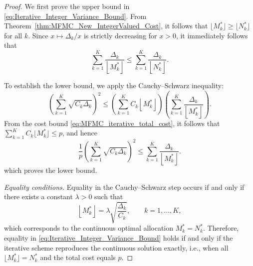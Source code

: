\begin{proof}
We first prove the upper bound in \eqref{eq:Iterative_Integer_Variance_Bound}.  
From Theorem~\ref{thm:MFMC_New_IntegerValued_Cost}, it follows that $\lfloor M_k^* \rfloor \ge \lfloor N_k^* \rfloor$ for all $k$.  
Since $x \mapsto \Delta_k/x$ is strictly decreasing for $x > 0$, it immediately follows that
\[
\sum_{k=1}^K \frac{\Delta_k}{\left\lfloor M_k^* \right\rfloor} 
\le \sum_{k=1}^K \frac{\Delta_k}{\left\lfloor N_k^* \right\rfloor}.
\]

\medskip
\noindent
To establish the lower bound, we apply the Cauchy--Schwarz inequality:
%
\[
\left(\sum_{k=1}^K \sqrt{C_k \Delta_k}\right)^2
\le
\left(\sum_{k=1}^K C_k \left\lfloor M_k^* \right\rfloor\right)
\left(\sum_{k=1}^K \frac{\Delta_k}{\left\lfloor M_k^* \right\rfloor}\right).
\]
%
From the cost bound \eqref{eq:MFMC_iterative_total_cost}, it follows that 
$\sum_{k=1}^K C_k \lfloor M_k^* \rfloor \le p$, and hence
%
\[
\frac{1}{p}\left(\sum_{k=1}^K \sqrt{C_k \Delta_k}\right)^2
\le
\sum_{k=1}^K \frac{\Delta_k}{\left\lfloor M_k^* \right\rfloor}.
\]
%
which proves the lower bound.

\medskip
\noindent
\textit{Equality conditions.} 
Equality in the Cauchy--Schwarz step occurs if and only if there exists a constant $\lambda>0$ such that
\[
\left\lfloor M_k^* \right\rfloor = \lambda \sqrt{\frac{\Delta_k}{C_k}}, \qquad k=1,\ldots,K,
\]
which corresponds to the continuous optimal allocation $M_k^* = N_k^*$. Therefore, equality in \eqref{eq:Iterative_Integer_Variance_Bound} holds if and only if the iterative scheme reproduces the continuous solution exactly, i.e., when all $\lfloor M_k^* \rfloor = N_k^*$ and the total cost equals $p$.
\end{proof}



